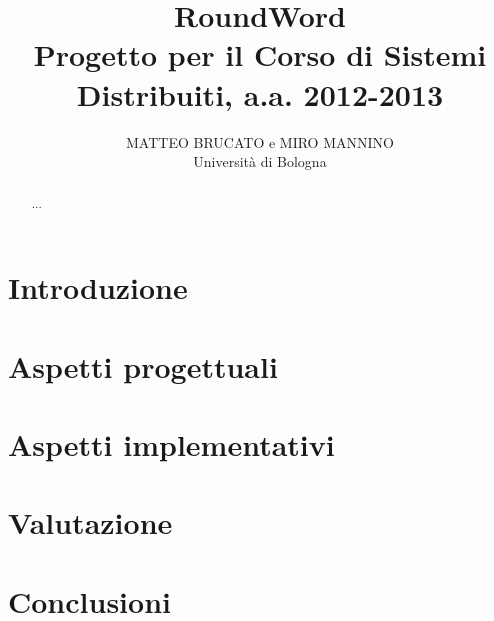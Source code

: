 \documentclass[10.5pt]{article}
\title{RoundWord\\
\large{Progetto per il Corso di Sistemi Distribuiti, a.a. 2012-2013}}
\author{MATTEO BRUCATO e MIRO MANNINO\\Università di Bologna}
\begin{document}

\maketitle

\begin{abstract}
...
\vspace*{100mm}
\end{abstract}


\tableofcontents

\section{Introduzione}


\section{Aspetti progettuali}


\section{Aspetti implementativi}


\section{Valutazione}


\section{Conclusioni}






\end{document}
